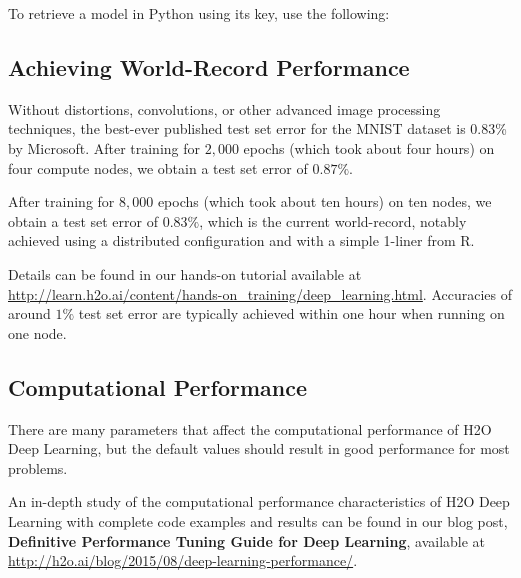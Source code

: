 {{\waterExampleInPython
To retrieve a model in Python using its key, use the following: 




\subsection{Achieving World-Record Performance}

Without distortions, convolutions, or other advanced image processing techniques, the best-ever published test set error for the MNIST dataset is $0.83$\% by Microsoft. After training for $2,000$ epochs (which took about four hours) on four compute nodes, we obtain a test set error of $0.87\%$. 

After training for $8,000$ epochs (which took about ten hours) on ten nodes, we obtain a test set error of $0.83\%$, which is the current world-record, notably achieved using a distributed configuration and with a simple 1-liner from R. 

Details can be found in our hands-on tutorial available at \url{http://learn.h2o.ai/content/hands-on_training/deep_learning.html}. Accuracies of around $1\%$ test set error are typically achieved within one hour when running on one node.

\subsection{Computational Performance}
There are many parameters that affect the computational performance of H2O Deep Learning, but the default values should result in good performance for most problems. 

An in-depth study of the computational performance characteristics of H2O Deep Learning with complete code examples and results can be found in our blog post, \textbf{Definitive Performance Tuning Guide for Deep Learning}, available at \url{http://h2o.ai/blog/2015/08/deep-learning-performance/}.

}}
